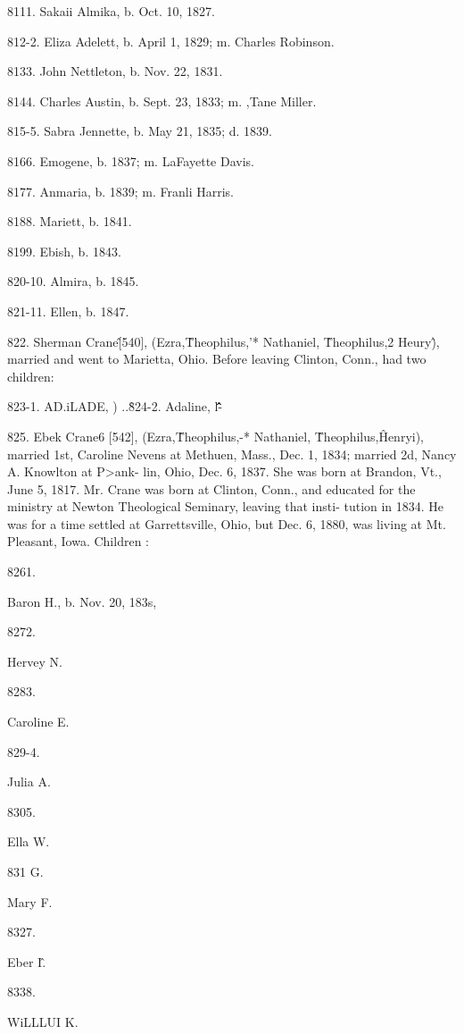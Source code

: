 \documentclass{book}
\begin{document}
8111. Sakaii Almika, b. Oct. 10, 1827. 

812-2. Eliza Adelett, b. April 1, 1829; m. Charles Robinson. 

8133. John Nettleton, b. Nov. 22, 1831. 

8144. Charles Austin, b. Sept. 23, 1833; m. ,Tane Miller. 

815-5. Sabra Jennette, b. May 21, 1835; d. 1839. 

8166. Emogene, b. 1837; m. LaFayette Davis. 

8177. Anmaria, b. 1839; m. Franli Harris. 

8188. Mariett, b. 1841. 

8199. Ebish, b. 1843. 

820-10. Almira, b. 1845. 

821-11. Ellen, b. 1847. 

822. Sherman Crane\^ [540], (Ezra,\^ Theophilus,'* Nathaniel, \^ 
Theophilus,2 Heury\^), married and went to Marietta, Ohio. 
Before leaving Clinton, Conn., had two children: 

823-1. AD.iLADE, ) ..\^ 
824-2. Adaline, l\^\^\^\^\^- 

825. Ebek Crane6 [542], (Ezra,\^ Theophilus,-* Nathaniel, \^ 
Theophilus,\^ Henryi), married 1st, Caroline Nevens at Methuen, 
Mass., Dec. 1, 1834; married 2d, Nancy A. Knowlton at P>ank- 
lin, Ohio, Dec. 6, 1837. She was born at Brandon, Vt., June 5, 
1817. Mr. Crane was born at Clinton, Conn., and educated for 
the ministry at Newton Theological Seminary, leaving that insti- 
tution in 1834. He was for a time settled at Garrettsville, Ohio, 
but Dec. 6, 1880, was living at Mt. Pleasant, Iowa. Children : 



8261. 


Baron H., b. Nov. 20, 183s, 


8272. 


Hervey N. 


8283. 


Caroline E. 


829-4. 


Julia A. 


8305. 


Ella W. 


831 G. 


Mary F. 


8327. 


Eber I\^. 


8338. 


WiLLLUI K. 
\end{document}
